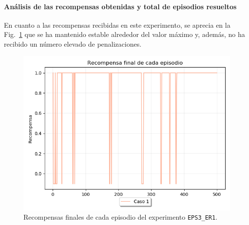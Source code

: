 \paragraph{Análisis de las recompensas obtenidas y total de episodios resueltos} 

En cuanto a las recompensas recibidas en este experimento, se aprecia en la Fig.~\ref{fig:dim5_lr0.01_ep0_recompensa} que se ha mantenido estable alrededor del valor máximo y, además, no ha recibido un número elevado de penalizaciones.  \\

\begin{figure}
    \centering
    \includegraphics[scale=0.4]{cap5_experimentacion/images/dim5_lr0.01_ep0_recompensa.png}
    \caption{Recompensas finales de cada episodio del experimento \texttt{EPS3\_ER1}.}
    \label{fig:dim5_lr0.01_ep0_recompensa}
\end{figure}

